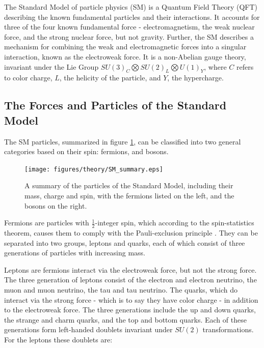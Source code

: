 
The Standard Model of particle physics (SM) is a Quantum Field Theory (QFT) describing the known fundamental particles and their interactions. It accounts for three of the four known fundamental force - electromagnetism, the weak nuclear force, and the strong nuclear force, but not gravity. Further, the SM describes a mechanism for combining the weak and electromagnetic forces into a singular interaction, known as the electroweak force. It is a non-Abelian gauge theory, invariant under the Lie Group $SU(3)_C\bigotimes SU(2)_L\bigotimes U(1)_Y$, where $C$ refers to color charge, $L$, the helicity of the particle, and $Y$, the hypercharge.

\subsection{The Forces and Particles of the Standard Model}
\label{sec:forcesParticles}

The SM particles, summarized in figure \ref{fig:SM_summary}, can be classified into two general categories based on their spin: fermions, and bosons. 

\begin{figure}[!htbp]
\centering
   \texttt{[image: figures/theory/SM\_summary.eps]}
\caption{A summary of the particles of the Standard Model, including their mass, charge and spin, with the fermions listed on the left, and the bosons on the right. \cite{}}
\label{fig:SM_summary}
\end{figure}

Fermions are particles with $\frac{1}{2}$-integer spin, which according to the spin-statistics theorem, causes them to comply with the Pauli-exclusion principle \cite{}. They can be separated into two groups, leptons and quarks, each of which consist of three generations of particles with increasing mass.

Leptons are fermions interact via the electroweak force, but not the strong force. The three generation of leptons consist of the electron and electron neutrino, the muon and muon neutrino, the tau and tau neutrino. The quarks, which do interact via the strong force - which is to say they have color charge - in addition to the electroweak force. The three generations include the up and down quarks, the strange and charm quarks, and the top and bottom quarks. Each of these generations form left-handed doublets invariant under $SU(2)$ transformations. For the leptons these doublets are:

